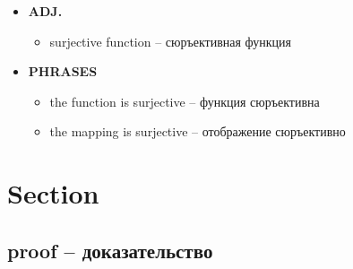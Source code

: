 \documentclass[a4paper, 10pt]{article}
\theoremstyle{definition}
\theoremstyle{plain}
\theoremstyle{remark}
\begin{document}
\begin{itemize}
    \item \textbf{ADJ.}
    \begin{itemize}
        \item surjective function – сюръективная функция
    \end{itemize}
    
    \item \textbf{PHRASES}
    \begin{itemize}
        \item the function is surjective – функция сюръективна
        \item the mapping is surjective – отображение сюръективно
    \end{itemize}
\end{itemize}


\section{Section}

\subsection{proof – доказательство}
\end{document}
